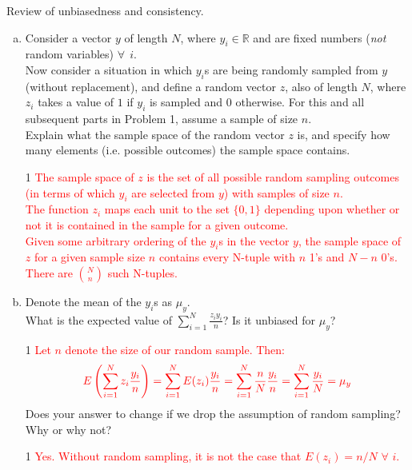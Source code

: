 \documentclass[12pt,letterpaper]{article}
\newcommand{\solutions}{0}
\begin{document}
Review of unbiasedness and consistency.
\begin{enumerate}[(a)]
\item Consider a vector $y$ of length $N$, where $y_{i}\in\mathbb{R}$ and are fixed numbers (\emph{not} random variables) $\forall \:\: i$. \\ 
Now consider a situation in which $y_{i}$s are being randomly sampled from $y$ (without replacement), and define a random vector $z$, also of length $N$, where $z_i$ takes a value of $1$ if $y_{i}$ is sampled and $0$ otherwise. For this and all subsequent parts in Problem 1, assume a sample of size $n$. \\ 

Explain what the sample space of the random vector $z$ is, and specify how many elements (i.e. possible outcomes) the sample space contains.

\if\solutions1
\textcolor{red}{The sample space of $z$ is the set of all possible random sampling outcomes (in terms of which $y_{i}$ are selected from $y$) with samples of size $n$. \\ 
The function $z_{i}$ maps each unit to the set $\{0,1\}$ depending upon whether or not it is contained in the sample for a given outcome. \\
Given some arbitrary ordering of the $y_i$s in the vector $y$, the sample space of $z$ for a given sample size $n$ contains every N-tuple with $n$ 1's and $N-n$ 0's. There are $N \choose n$ such N-tuples.} \\[.25em]
\fi

\item Denote the mean of the $y_{i}$s as $\mu_y$. \\ What is the expected value of $\sum_{i=1}^{N} \frac{z_i y_i}{n}$? Is it unbiased for $\mu_y$? 

\if\solutions1
\textcolor{red}{Let $n$ denote the size of our random sample. Then:}
\begin{align*}
\textcolor{red}{E\left(\sum_{i=1}^N z_i \frac{y_i}{n}\right)=\sum_{i=1}^N E(z_i) \frac{y_i}{n}=\sum_{i=1}^N \frac{n}{N} \frac{y_i}{n}=\sum_{i=1}^N \frac{y_i}{N}=\mu_y}
\end{align*}
\fi
 Does your answer to change if we drop the assumption of random sampling? Why or why not? 
 
 \if\solutions1
 \textcolor{red}{Yes. Without random sampling, it is not the case that $E(z_{i})=n/N$ $\forall$ $i$.}
 \fi
 
 

\end{enumerate}
\end{document}
